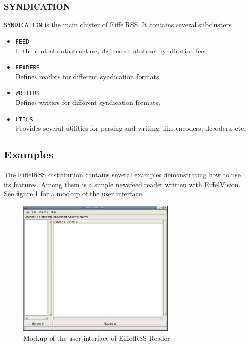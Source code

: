 \documentclass[a4paper,fleqn,titlepage]{article}
\begin{document}
\subsubsection{SYNDICATION}

\texttt{SYNDICATION} is the main cluster of EiffelRSS. It contains
several subclusters:

\begin{itemize}
\item \texttt{FEED} \\
  Is the central datastructure, defines an abstract syndication feed.
\item \texttt{READERS} \\
  Defines readers for different syndication formats.
\item \texttt{WRITERS} \\
  Defines writers for different syndication formats.
\item \texttt{UTILS} \\
  Provides several utilities for parsing and writing, like encoders, decoders, etc. 
\end{itemize}


\subsection{Examples}
\label{sec:examples}

The EiffelRSS distribution contains several examples demonstrating how
to use its features. Among them is a simple newsfeed reader written
with EiffelVision. See figure \ref{fig:reader} for a mockup of the
user interface.

\begin{figure}[htbp]
  \centering
  \includegraphics[width=0.7\textwidth]{./figures/main-window}
  \caption{Mockup of the user interface of EiffelRSS Reader}
  \label{fig:reader}
\end{figure}
\end{document}
